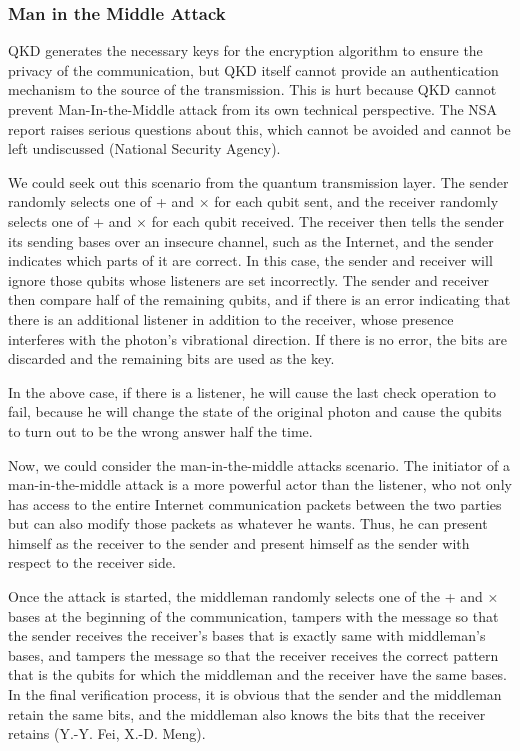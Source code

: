 \documentclass[sigconf]{acmart}
\begin{document}
\subsubsection{Man in the Middle Attack}
QKD generates the necessary keys for the encryption algorithm to ensure the privacy of the communication, but QKD itself cannot provide an authentication mechanism to the source of the transmission. This is hurt because QKD cannot prevent Man-In-the-Middle attack from its own technical perspective. The NSA report raises serious questions about this, which cannot be avoided and cannot be left undiscussed (National Security Agency).

We could seek out this scenario from the quantum transmission layer. The sender randomly selects one of + and × for each qubit sent, and the receiver randomly selects one of + and × for each qubit received. The receiver then tells the sender its sending bases over an insecure channel, such as the Internet, and the sender indicates which parts of it are correct. In this case, the sender and receiver will ignore those qubits whose listeners are set incorrectly. The sender and receiver then compare half of the remaining qubits, and if there is an error indicating that there is an additional listener in addition to the receiver, whose presence interferes with the photon's vibrational direction. If there is no error, the bits are discarded and the remaining bits are used as the key.

In the above case, if there is a listener, he will cause the last check operation to fail, because he will change the state of the original photon and cause the qubits to turn out to be the wrong answer half the time.

Now, we could consider the man-in-the-middle attacks scenario. The initiator of a man-in-the-middle attack is a more powerful actor than the listener, who not only has access to the entire Internet communication packets between the two parties but can also modify those packets as whatever he wants. Thus, he can present himself as the receiver to the sender and present himself as the sender with respect to the receiver side. %

% 
Once the attack is started, the middleman randomly selects one of the + and × bases at the beginning of the communication, tampers with the message so that the sender receives the receiver’s bases that is exactly same with middleman’s bases, and tampers the message so that the receiver receives the correct pattern that is the qubits for which the middleman and the receiver have the same bases. In the final verification process, it is obvious that the sender and the middleman retain the same bits, and the middleman also knows the bits that the receiver retains (Y.-Y. Fei, X.-D. Meng).
\end{document}
